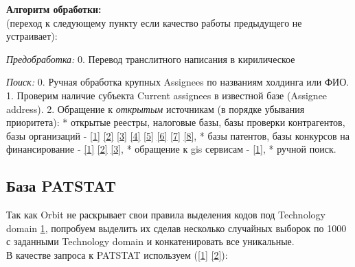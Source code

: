 \documentclass[11pt]{article}
\begin{document}
    \textbf{Алгоритм обработки:}\\
(переход к следующему пункту если качество работы предыдущего не
устраивает):

\emph{Предобработка:} 0. Перевод транслитного написания в кирилическое

\emph{Поиск:} 0. Ручная обработка крупных Assignees по названиям
холдинга или ФИО. 1. Проверим наличие субъекта Current assignees в
известной базе (Assignee address). 2. Обращение к \emph{открытым}
источникам (в порядке убывания приоритета): * открытые реестры,
налоговые базы, базы проверки контрагентов, базы организаций -
\href{https://egrul.nalog.ru/index.html}{{[}1{]}}
\href{http://zakupki.gov.ru/epz/organization/quicksearch/search.html?searchString=\%D0\%9A\%D0\%B0\%D1\%81\%D0\%BF\%D0\%B5\%D1\%80\%D1\%81\%D0\%BA\%D0\%BE\%D0\%B3\%D0\%BE\&morphology=on\&pageNumber=1\&sortDirection=true\&recordsPerPage=_10\&sortBy=PO_NAZVANIYU\&fz94=on\&fz223=on\&regionDeleted=false}{{[}2{]}}
\href{http://online.igk-group.ru/ru/home?name=\%D0\%90\%D0\%9E+\%22+\%D0\%9B\%D0\%90\%D0\%91\%D0\%9E\%D0\%A0\%D0\%90\%D0\%A2\%D0\%9E\%D0\%A0\%D0\%98\%D0\%AF+\%D0\%9A\%D0\%90\%D0\%A1\%D0\%9F\%D0\%95\%D0\%A0\%D0\%A1\%D0\%9A\%D0\%9E\%D0\%93\%D0\%9E\&ogrn=\&inn=}{{[}3{]}}
\href{https://www.list-org.com/}{{[}4{]}}
\href{https://www.kartoteka.ru/}{{[}5{]}}
\href{https://zachestnyibiznes.ru/}{{[}6{]}}
\href{https://sbis.ru/}{{[}7{]}} \href{https://nalog.io/}{{[}8{]}}, *
базы патентов, базы конкурсов на финансирование -
\href{http://www.findpatent.ru/}{{[}1{]}}
\href{https://patentdb.ru/}{{[}2{]}}
\href{https://4science.ru/}{{[}3{]}}, * обращение к gis сервисам -
\href{https://2gis.ru/}{{[}1{]}}, * ручной поиск.

    \subsection{База PATSTAT}\label{ux431ux430ux437ux430-patstat}

    Так как Orbit не раскрывает свои правила выделения кодов под Technology
domain
\href{https://static.orbit.com/orbit/help/1.9.8/en/index.html\#!Documents/technologydomain.htm}{1},
попробуем выделить их сделав несколько случайных выборок по 1000 с
заданными Technology domain и конкатенировать все уникальные.\\
В качестве запроса к PATSTAT используем
(\href{https://forums.epo.org/coding-with-boolean-operators-for-ipc-codes-5542}{{[}1{]}}
\href{https://forums.epo.org/count-patent-based-on-assignee-country-7832}{{[}2{]}}):
\end{document}
